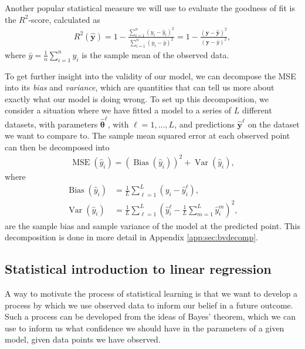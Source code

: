 \documentclass[twocolumn,english,notitlepage]{article}
\renewcommand{\vec}[1]{\boldsymbol{#1}}
\newcommand{\pclosed}[1]{\left(#1\right)}
\DeclareMathOperator{\mse}{\operatorname{MSE}}
\renewcommand{\var}{\operatorname{Var}}
\newcommand{\bias}{\operatorname{Bias}}
\begin{document}
        Another popular statistical measure we will use to evaluate the goodness of fit is the $R^2$-score, calculated as
        \begin{align}
            R^2(\vec{\hat{y}}) = 1 - \frac{\sum_{i=1}^n (y_i-\hat{y}_i)^2}{\sum_{i=1}^n (y_i-\bar{y})^2} = 1 - \frac{(\vec{y}-\vec{\hat{y}})^2}{(\vec{y}-\bar{y})^2},
        \end{align}
        where $\bar{y} = \frac{1}{n}\sum_{i=1}^n y_i$ is the sample mean of the observed data.


        To get further insight into the validity of our model, we can decompose the MSE into its \textit{bias} and \textit{variance}, which are quantities that can tell us more about exactly what our model is doing wrong. To set up this decomposition, we consider a situation where we have fitted a model to a series of $L$ different datasets, with parameters $\vec{\hat{\theta}}^\ell$, with $\ell=1,...,L$, and predictions $\vec{\hat{y}}^\ell$ on the dataset we want to compare to. The sample mean squared error at each observed point can then be decomposed into
        \begin{align}
            \mse(\hat{y}_i) = \pclosed{\bias(\hat{y}_i)}^2 + \var(\hat{y}_i),
        \end{align}
        where 
        \begin{subequations}
            \begin{align}
                \bias(\hat{y}_i) &= \frac{1}{L}\sum_{\ell=1}^L \pclosed{y_i - \hat{y}_i^\ell}, \\
                \var(\hat{y}_i) &= \frac{1}{L}\sum_{\ell=1}^L \pclosed{\hat{y}_i^\ell - \frac{1}{L} \sum_{m=1}^L \hat{y}_i^m }^2,
            \end{align}
        \end{subequations}
        are the sample bias and sample variance of the model at the predicted point. This decomposition is done in more detail in Appendix \ref{app:sec:bvdecomp}. 
        


    \subsection{Statistical introduction to linear regression}
        A way to motivate the process of statistical learning is that we want to develop a process by which we use observed data to inform our belief in a future outcome. Such a process can be developed from the ideas of Bayes' theorem, which we can use to inform us what confidence we should have in the parameters of a given model, given data points we have observed.
        
\end{document}
